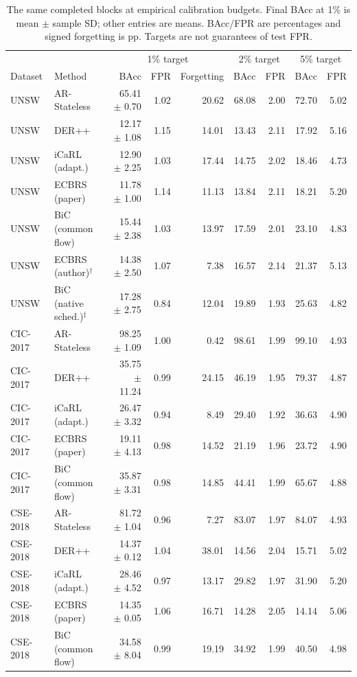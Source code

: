 \begin{table}[t]\centering\scriptsize
\caption{The same completed blocks at empirical calibration budgets. Final BAcc at 1\% is mean $\pm$ sample SD; other entries are means. BAcc/FPR are percentages and signed forgetting is pp. Targets are not guarantees of test FPR.}
\label{tab:published-baselines-calibrated}
\begin{tabular}{llrrrrrrr}\toprule
& & \multicolumn{3}{c}{1\% target} & \multicolumn{2}{c}{2\% target} & \multicolumn{2}{c}{5\% target}\\
Dataset & Method & BAcc & FPR & Forgetting & BAcc & FPR & BAcc & FPR\\\midrule
UNSW & AR-Stateless & 65.41 $\pm$ 0.70 & 1.02 & 20.62 & 68.08 & 2.00 & 72.70 & 5.02\\
UNSW & DER++ & 12.17 $\pm$ 1.08 & 1.15 & 14.01 & 13.43 & 2.11 & 17.92 & 5.16\\
UNSW & iCaRL (adapt.) & 12.90 $\pm$ 2.25 & 1.03 & 17.44 & 14.75 & 2.02 & 18.46 & 4.73\\
UNSW & ECBRS (paper) & 11.78 $\pm$ 1.00 & 1.14 & 11.13 & 13.84 & 2.11 & 18.21 & 5.20\\
UNSW & BiC (common flow) & 15.44 $\pm$ 2.38 & 1.03 & 13.97 & 17.59 & 2.01 & 23.10 & 4.83\\
UNSW & ECBRS (author)$^\dagger$ & 14.38 $\pm$ 2.50 & 1.07 & 7.38 & 16.57 & 2.14 & 21.37 & 5.13\\
UNSW & BiC (native sched.)$^\ddagger$ & 17.28 $\pm$ 2.75 & 0.84 & 12.04 & 19.89 & 1.93 & 25.63 & 4.82\\
CIC-2017 & AR-Stateless & 98.25 $\pm$ 1.09 & 1.00 & 0.42 & 98.61 & 1.99 & 99.10 & 4.93\\
CIC-2017 & DER++ & 35.75 $\pm$ 11.24 & 0.99 & 24.15 & 46.19 & 1.95 & 79.37 & 4.87\\
CIC-2017 & iCaRL (adapt.) & 26.47 $\pm$ 3.32 & 0.94 & 8.49 & 29.40 & 1.92 & 36.63 & 4.90\\
CIC-2017 & ECBRS (paper) & 19.11 $\pm$ 4.13 & 0.98 & 14.52 & 21.19 & 1.96 & 23.72 & 4.90\\
CIC-2017 & BiC (common flow) & 35.87 $\pm$ 3.31 & 0.98 & 14.85 & 44.41 & 1.99 & 65.67 & 4.88\\
CSE-2018 & AR-Stateless & 81.72 $\pm$ 1.04 & 0.96 & 7.27 & 83.07 & 1.97 & 84.07 & 4.93\\
CSE-2018 & DER++ & 14.37 $\pm$ 0.12 & 1.04 & 38.01 & 14.56 & 2.04 & 15.71 & 5.02\\
CSE-2018 & iCaRL (adapt.) & 28.46 $\pm$ 4.52 & 0.97 & 13.17 & 29.82 & 1.97 & 31.90 & 5.20\\
CSE-2018 & ECBRS (paper) & 14.35 $\pm$ 0.05 & 1.06 & 16.71 & 14.28 & 2.05 & 14.14 & 5.06\\
CSE-2018 & BiC (common flow) & 34.58 $\pm$ 8.04 & 0.99 & 19.19 & 34.92 & 1.99 & 40.50 & 4.98\\
\bottomrule\end{tabular}\end{table}
